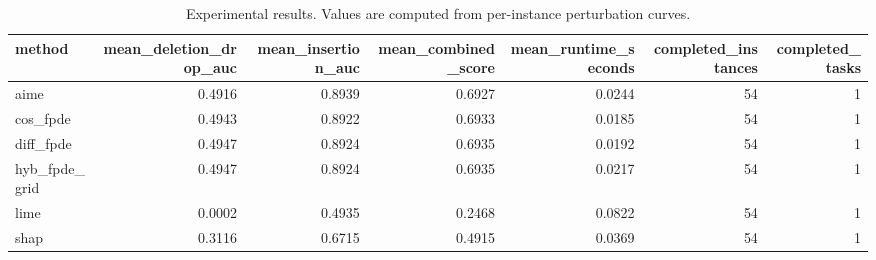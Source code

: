 \begin{table}[t]
\caption{Experimental results. Values are computed from per-instance perturbation curves.}
\label{tab:main_results_computed}
\centering
\begin{tabular}{lrrrrrr}
\toprule
method & mean\_deletion\_drop\_auc & mean\_insertion\_auc & mean\_combined\_score & mean\_runtime\_seconds & completed\_instances & completed\_tasks \\
\midrule
aime & 0.4916 & 0.8939 & 0.6927 & 0.0244 & 54 & 1 \\
cos\_fpde & 0.4943 & 0.8922 & 0.6933 & 0.0185 & 54 & 1 \\
diff\_fpde & 0.4947 & 0.8924 & 0.6935 & 0.0192 & 54 & 1 \\
hyb\_fpde\_grid & 0.4947 & 0.8924 & 0.6935 & 0.0217 & 54 & 1 \\
lime & 0.0002 & 0.4935 & 0.2468 & 0.0822 & 54 & 1 \\
shap & 0.3116 & 0.6715 & 0.4915 & 0.0369 & 54 & 1 \\
\bottomrule
\end{tabular}

\end{table}
